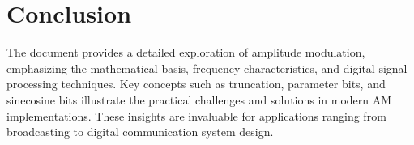 \documentclass[paper=a4, fontsize=11pt, onecolumn]{scrartcl}	 %
\begin{document}
\section*{Conclusion}
The document provides a detailed exploration of amplitude modulation, emphasizing the mathematical basis, frequency characteristics, and digital signal processing techniques. 
Key concepts such as truncation, parameter bits, and sinecosine bits illustrate the practical challenges and solutions in modern AM implementations. These insights are invaluable 
for applications ranging from broadcasting to digital communication system design.













\end{document}
